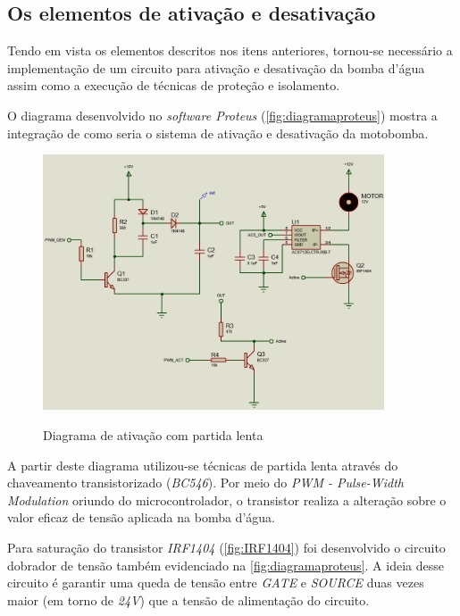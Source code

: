 \subsection{Os elementos de ativação e desativação}

Tendo em vista os elementos descritos nos itens anteriores, tornou-se necessário a implementação de um circuito para ativação e desativação da bomba d'água assim como a execução de técnicas de proteção e isolamento.

O diagrama desenvolvido no \textit{software Proteus} (\autoref{fig:diagramaproteus}) mostra a integração de como seria o sistema de ativação e desativação da motobomba.

\begin{figure}[H]
	\centering
	\caption{Diagrama de ativação com partida lenta}
	\includegraphics[width=0.9\textwidth]{figuras/diagrama_ativação_bomba.png}
	\label{fig:diagramaproteus}
\end{figure} 

A partir deste diagrama utilizou-se técnicas de partida lenta através do chaveamento transistorizado (\textit{BC546}). Por meio do \textit{PWM - Pulse-Width Modulation} oriundo do microcontrolador, o transistor realiza a alteração sobre o valor eficaz de tensão aplicada na bomba d'água.

Para saturação do transistor \textit{IRF1404} (\autoref{fig:IRF1404}) foi desenvolvido o circuito dobrador de tensão também evidenciado na \autoref{fig:diagramaproteus}. A ideia desse circuito é garantir uma queda de tensão entre \textit{GATE} e \textit{SOURCE} duas vezes maior (em torno de \textit{24V}) que a tensão de alimentação do circuito.

